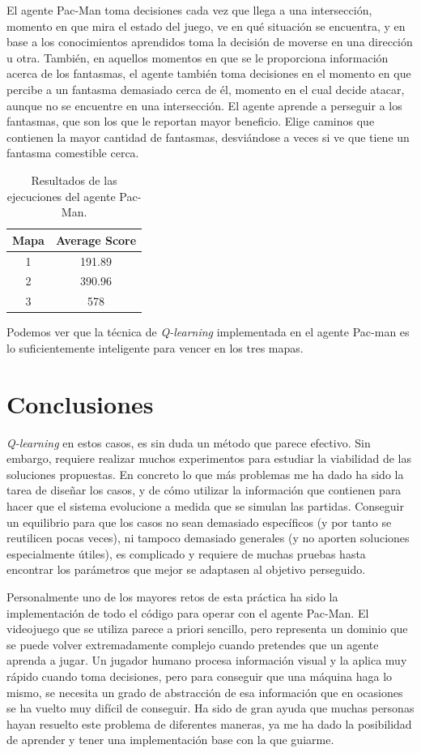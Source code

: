 \documentclass[11pt]{exam}
\begin{document}
El agente Pac-Man toma decisiones cada vez que llega a una intersección, momento en que mira el estado del juego, ve en qué situación se encuentra, y en base a los conocimientos aprendidos toma la decisión de moverse en una dirección u otra. También, en aquellos momentos en que se le proporciona información acerca de los fantasmas, el agente también toma decisiones en el momento en que percibe a un fantasma demasiado cerca de él, momento en el cual decide atacar, aunque no se encuentre en una intersección. El agente aprende a perseguir a los fantasmas, que son los que le reportan mayor beneficio. Elige caminos que contienen la mayor cantidad de fantasmas, desviándose a veces si ve que tiene un fantasma comestible cerca.

\begin{table}[H]
	\centering
	\begin{tabular}{|c|c|} 
		\hline
		Mapa & Average Score \\ 
		\hline
		1 & 191.89 \\ 
		2 & 390.96 \\
		3 & 578 \\
		\hline
	\end{tabular}
	\caption{Resultados de las ejecuciones del agente Pac-Man.}
	\label{resultados_ejecuciones}
\end{table}

Podemos ver que la técnica de \textit{Q-learning} implementada en el agente Pac-man es lo suficientemente inteligente para vencer en los tres mapas.
 
\section{Conclusiones}\label{conclusiones}

\textit{Q-learning} en estos casos, es sin duda un método que parece efectivo. Sin embargo, requiere realizar muchos experimentos para estudiar la viabilidad de las soluciones propuestas. En concreto lo que más problemas me ha dado ha sido la tarea de diseñar los casos, y de cómo utilizar la información que contienen para hacer que el sistema evolucione a medida que se simulan las partidas. Conseguir un equilibrio para que los casos no sean demasiado específicos (y por tanto se reutilicen pocas veces), ni tampoco demasiado generales (y no aporten soluciones especialmente útiles), es complicado y requiere de muchas pruebas hasta encontrar los parámetros que mejor se adaptasen al objetivo perseguido.

Personalmente uno de los mayores retos de esta práctica ha sido la implementación de todo el código para operar con el agente Pac-Man. El videojuego que se utiliza parece a priori sencillo, pero representa un dominio que se puede volver extremadamente complejo cuando pretendes que un agente aprenda a jugar. Un jugador humano procesa información visual y la aplica muy rápido cuando toma decisiones, pero para conseguir que una máquina haga lo mismo, se necesita un grado de abstracción de esa información que en ocasiones se ha vuelto muy difícil de conseguir. Ha sido de gran ayuda que muchas personas hayan resuelto este problema de diferentes maneras, ya me ha dado la posibilidad de aprender y tener una implementación base con la que guiarme.
\end{document}
